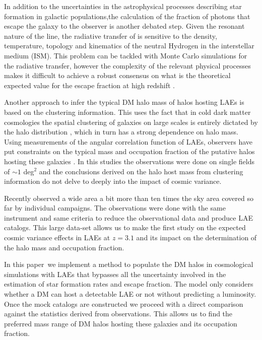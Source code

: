 \documentclass[usenatbib]{mn2e}
\newcommand{\documentname}{paper~}
\newcommand{\ly}{{\ifmmode{{\rm Ly}\alpha}\else{Ly$\alpha$~}\fi}}
\begin{document}
In addition to the uncertainties in the astrophysical processes
describing star formation in galactic populations,the calculation
of the fraction of \ly photons that escape the galaxy to the observer
is another debated step. Given the resonant nature of the \ly line,
the radiative transfer of \ly is sensitive to the density,
temperature, topology and kinematics of the neutral Hydrogen in the
interstellar medium
(ISM). This problem can be tackled with Monte Carlo simulations for the
radiative transfer, however the complexity of the relevant physical
processes makes it difficult to achieve a robust consensus on what is
the theoretical expected value for the \ly escape fraction
at high redshift
\citep{Neufeld1991,Verhamme2006,ForeroRomero2011,Dijkstra2012,Laursen2013,Orsi2012}. 

Another approach to infer the typical DM halo mass of halos hosting
LAEs is based on the clustering information. This uses the fact that in cold
dark matter cosmologies the spatial clustering of galaxies on large
scales is entirely dictated by the halo distribution
\citep{Colberg00}, which in turn has a strong dependence on halo
mass. Using measurements of the angular correlation function of LAEs,
observers have put constraints on the typical mass and occupation
fraction of the putative halos hosting these galaxies
\citep{Hayashino2004,Gawiser07,Nilsson2007,Ouchi2010}. In this
studies the observations were done on single fields of $\sim 1$
deg$^{2}$ and the conclusions derived on the halo host mass from
clustering information do not delve to deeply into the impact of
cosmic variance.

Recently \cite{Yamada2012} observed a wide area a bit more than ten
times the sky area covered so far by individual campaigns. The
observations were done with the same instrument and same criteria to
reduce the observational data and produce LAE catalogs. This large
data-set allows us to make the first study on the expected cosmic
variance effects in LAEs at $z=3.1$ and its impact on the
determination of the halo mass and occupation fraction. 


In this \documentname we implement a method to populate the DM halos
in cosmological simulations with LAEs that bypasses all the
uncertainty involved in the estimation of star formation rates and \ly escape
fraction. The model only considers whether a DM can host a
detectable LAE or not without predicting a \ly  luminosity. Once the
mock catalogs are constructed  we proceed with a direct comparison
against the statistics derived from observations. This allows us 
to find the preferred mass range of DM halos hosting these galaxies
and its occupation fraction.
\end{document}
